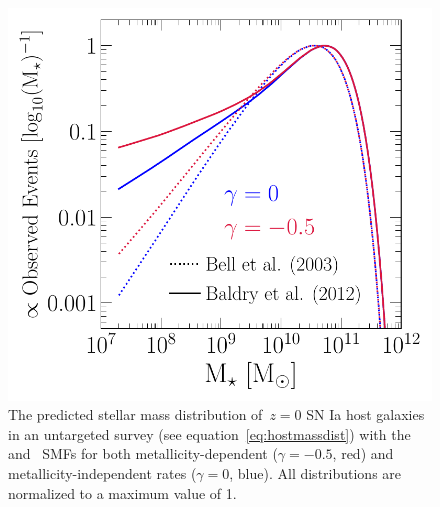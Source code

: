 \documentclass[foo.tex]{subfiles}
\begin{document}

\begin{figure}
\centering
\includegraphics[scale = 0.55]{ia_massdist.pdf}
\caption{
The predicted stellar mass distribution of~$z = 0$ SN Ia host galaxies in an
untargeted survey (see equation~\ref{eq:hostmassdist}) with the
\citet[][dotted]{Bell2003} and~\citet[][solid]{Baldry2012} SMFs for both
metallicity-dependent ($\gamma = -0.5$, red) and metallicity-independent rates
($\gamma = 0$, blue).
All distributions are normalized to a maximum value of 1.
}
\label{fig:hostmassdist}
\end{figure}
\end{document}
